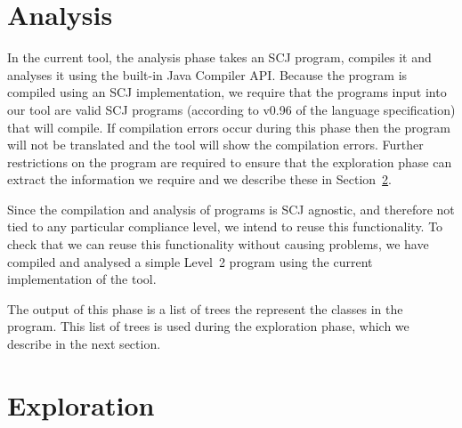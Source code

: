 \documentclass[10pt,a4paper]{article}
\begin{document}
\section{Analysis}
\label{sec:analysis}

In the current tool, the analysis phase takes an SCJ program, compiles it and analyses it using the built-in Java Compiler API. Because the program is compiled using an SCJ implementation, we require that the programs input into our tool are valid SCJ programs (according to v0.96 of the language specification) that will compile. If compilation errors occur during this phase then the program will not be translated and the tool will show the compilation errors. Further restrictions on the program are required to ensure that the exploration phase can extract the information we require and we describe these in Section~\ref{sec:exploration}.

Since the compilation and analysis of programs is SCJ agnostic, and therefore not tied to any particular compliance level, we intend to reuse this functionality. To check that we can reuse this functionality without causing problems, we have compiled and analysed a simple Level~2 program using the current implementation of the tool. 

The output of this phase is a list of trees the represent the classes in the program. This list of trees is used during the exploration phase, which we describe in the next section.

\section{Exploration}
\label{sec:exploration}
\end{document}
